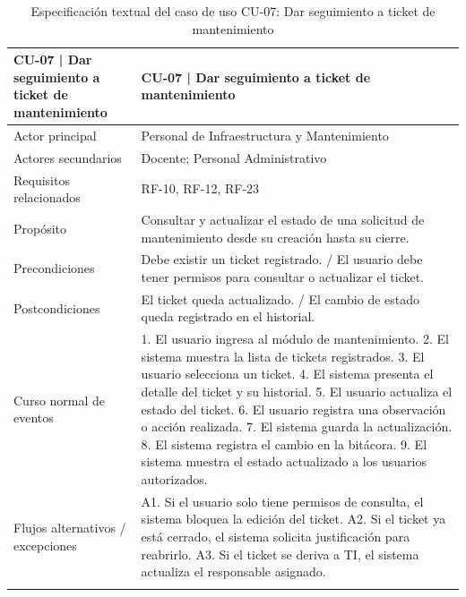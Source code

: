 \begingroup
\small
\begin{longtable}{|P{0.5000}|P{0.5000}|}
\hline
CU-07 | Dar seguimiento a ticket de mantenimiento & CU-07 | Dar seguimiento a ticket de mantenimiento \\ \hline
Actor principal & Personal de Infraestructura y Mantenimiento \\ \hline
Actores secundarios & Docente; Personal Administrativo \\ \hline
Requisitos relacionados & RF-10, RF-12, RF-23 \\ \hline
Propósito & Consultar y actualizar el estado de una solicitud de mantenimiento desde su creación hasta su cierre. \\ \hline
Precondiciones & Debe existir un ticket registrado. / El usuario debe tener permisos para consultar o actualizar el ticket. \\ \hline
Postcondiciones & El ticket queda actualizado. / El cambio de estado queda registrado en el historial. \\ \hline
Curso normal de eventos & 1. El usuario ingresa al módulo de mantenimiento. 2. El sistema muestra la lista de tickets registrados. 3. El usuario selecciona un ticket. 4. El sistema presenta el detalle del ticket y su historial. 5. El usuario actualiza el estado del ticket. 6. El usuario registra una observación o acción realizada. 7. El sistema guarda la actualización. 8. El sistema registra el cambio en la bitácora. 9. El sistema muestra el estado actualizado a los usuarios autorizados. \\ \hline
Flujos alternativos / excepciones & A1. Si el usuario solo tiene permisos de consulta, el sistema bloquea la edición del ticket. A2. Si el ticket ya está cerrado, el sistema solicita justificación para reabrirlo. A3. Si el ticket se deriva a TI, el sistema actualiza el responsable asignado. \\ \hline
\caption{Especificación textual del caso de uso CU-07: Dar seguimiento a ticket de mantenimiento}
\end{longtable}
\endgroup

